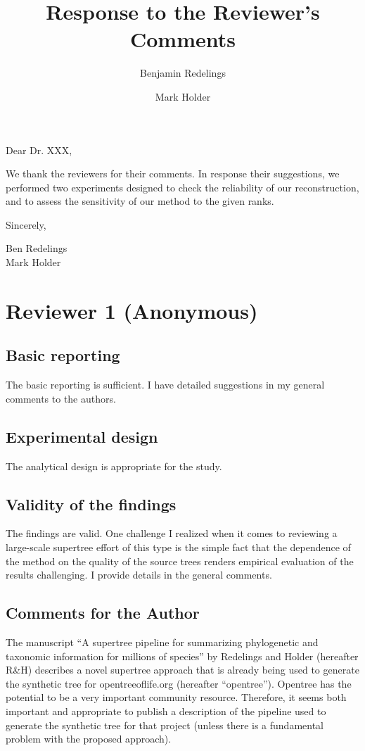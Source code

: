 \documentclass{article}
\title{Response to the Reviewer's Comments}
\author{Benjamin Redelings \and Mark Holder}
\begin{document}
\maketitle

Dear Dr. XXX,

We thank the reviewers for their comments.  In response their suggestions, we performed
two experiments designed to check the reliability of our reconstruction, and to assess
the sensitivity of our method to the given ranks.

Sincerely,

Ben Redelings\\
Mark Holder

\clearpage

\section*{Reviewer 1 (Anonymous)}
\subsection*{Basic reporting}

The basic reporting is sufficient. I have detailed suggestions in my general comments to the authors.

\subsection*{Experimental design}

The analytical design is appropriate for the study.

\subsection*{Validity of the findings}

The findings are valid. One challenge I realized when it comes to reviewing a large-scale supertree effort of this type is the simple fact that the dependence of the method on the quality of the source trees renders empirical evaluation of the results challenging. I provide details in the general comments.

\subsection*{Comments for the Author}
The manuscript ``A supertree pipeline for summarizing phylogenetic and taxonomic information for millions of species'' by Redelings and Holder (hereafter R\&H) describes a novel supertree approach that is already being used to generate the synthetic tree for opentreeoflife.org (hereafter “opentree”). Opentree has the potential to be a very important community resource. Therefore, it seems both important and appropriate to publish a description of the pipeline used to generate the synthetic tree for that project (unless there is a fundamental problem with the proposed approach).
\end{document}
